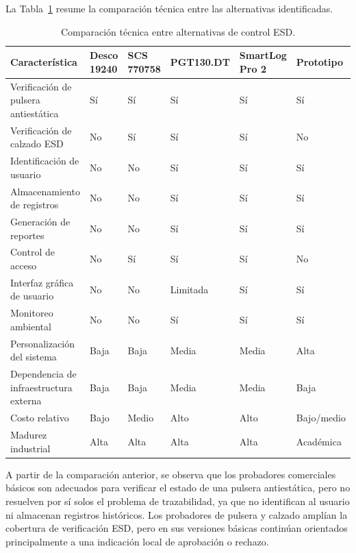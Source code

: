 La Tabla~\ref{tab:comparacion_tecnica_alternativas} resume la comparación técnica entre
las alternativas identificadas.

\begin{table}[H]
\centering
\footnotesize
\caption{Comparación técnica entre alternativas de control ESD.}
\label{tab:comparacion_tecnica_alternativas}
\renewcommand{\arraystretch}{1.25}
\begin{tabular}{p{3.3cm}
>{\centering\arraybackslash}p{1.7cm}
>{\centering\arraybackslash}p{1.9cm}
>{\centering\arraybackslash}p{1.9cm}
>{\centering\arraybackslash}p{1.9cm}
>{\centering\arraybackslash}p{1.9cm}}
\toprule
\textbf{Característica} &
\textbf{Desco 19240} &
\textbf{SCS 770758} &
\textbf{PGT130.\newline DT} &
\textbf{SmartLog Pro 2} &
\textbf{Prototipo} \\
\midrule
Verificación de pulsera antiestática & Sí & Sí & Sí & Sí & Sí \\
Verificación de calzado ESD & No & Sí & Sí & Sí & No \\
Identificación de usuario & No & No & Sí & Sí & Sí \\
Almacenamiento de registros & No & No & Sí & Sí & Sí \\
Generación de reportes & No & No & Sí & Sí & Sí \\
Control de acceso & No & Sí & Sí & Sí & No \\
Interfaz gráfica de usuario & No & No & Limitada & Sí & Sí \\
Monitoreo ambiental & No & No & Sí & Sí & Sí \\
Personalización del sistema & Baja & Baja & Media & Media & Alta \\
Dependencia de infraestructura externa & Baja & Baja & Media & Media & Baja \\
Costo relativo & Bajo & Medio & Alto & Alto & Bajo/medio \\
Madurez industrial & Alta & Alta & Alta & Alta & Académica \\
\bottomrule
\end{tabular}
\end{table}

A partir de la comparación anterior, se observa que los probadores comerciales básicos son
adecuados para verificar el estado de una pulsera antiestática, pero no resuelven por sí
solos el problema de trazabilidad, ya que no identifican al usuario ni almacenan registros
históricos. Los probadores de pulsera y calzado amplían la cobertura de verificación ESD,
pero en sus versiones básicas continúan orientados principalmente a una indicación local
de aprobación o rechazo.


